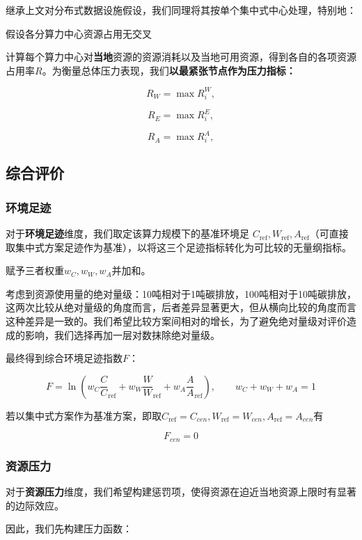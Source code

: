 继承上文对分布式数据设施假设，我们同理将其按单个集中式中心处理，特别地：

\begin{asum}
假设各分算力中心资源占用无交叉
\end{asum}

计算每个算力中心对\textbf{当地}资源的资源消耗以及当地可用资源，得到各自的各项资源占用率$R$。为衡量总体压力表现，我们\textbf{以最紧张节点作为压力指标：}

\[
R_W=\max R_i^W,
\]

\[
R_E=\max R_i^E,
\]

\[
R_A=\max R_i^A,
\]

\subsection{综合评价}

\subsubsection{环境足迹}

对于\textbf{环境足迹}维度，我们取定该算力规模下的基准环境足 $C_{\mathrm{ref}},W_{\mathrm{ref}},A_{\mathrm{ref}}$（可直接取集中式方案足迹作为基准），以将这三个足迹指标转化为可比较的无量纲指标。

赋予三者权重$w_C,w_W,w_A$并加和。

考虑到资源使用量的绝对量级：10吨相对于1吨碳排放，100吨相对于10吨碳排放，这两次比较从绝对量级的角度而言，后者差异显著更大，但从横向比较的角度而言这种差异是一致的。我们希望比较方案间相对的增长，为了避免绝对量级对评价造成的影响，我们选择再加一层对数抹除绝对量级。

最终得到综合环境足迹指数$F$：

\[
F=\ln (w_C\frac{C}C_{\mathrm{ref}}+w_W\frac{W}W_{\mathrm{ref}}+w_A\frac{A}A_{\mathrm{ref}}), \qquad w_C+w_W+w_A=1
\]

若以集中式方案作为基准方案，即取$C_{\mathrm{ref}}=C_{cen},W_{\mathrm{ref}}=W_{cen},A_{\mathrm{ref}}=A_{cen}$有

\[
F_{cen}=0
\]

\subsubsection{资源压力}

对于\textbf{资源压力}维度，我们希望构建惩罚项，使得资源在迫近当地资源上限时有显著的边际效应。

因此，我们先构建压力函数：

